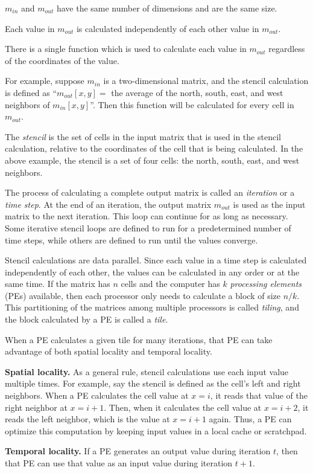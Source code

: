 \documentclass[preprint,nocopyrightspace]{styles/sigplanconf}
\begin{document}
\begin{enumerate*}
\item $m_{in}$ and $m_{out}$ have the same number of dimensions and
  are the same size.
\item Each value in $m_{out}$ is calculated independently of each
  other value in $m_{out}$.
\item There is a single function which is used to calculate each value
  in $m_{out}$ regardless of the coordinates of the value.
\end{enumerate*}

For example, suppose $m_{in}$ is a two-dimensional matrix, and the stencil calculation 
is defined as ``$m_{out}[x, y] =$ the average
of the north, south, east, and west neighbors of $m_{in}[x, y]$''.
Then this function will be calculated for every cell in $m_{out}$.

The {\em stencil} is the set of cells in the input matrix that is used in the stencil calculation, relative to
the coordinates of the cell that is being calculated. 
In the above example, the stencil is a set
of four cells: the north, south, east, and west neighbors.

The process of calculating a complete output matrix is called an {\em
  iteration} or a {\em time step}.  At the end of an iteration, 
the output matrix $m_{out}$ is used as the input matrix to the
next iteration.  This loop can continue for as long as necessary.
Some iterative stencil loops are defined to run for a predetermined
number of time steps, while others are defined to run until
the values converge.

Stencil calculations are data parallel.  Since each value in
a time step is calculated independently of each other, the values can be
calculated in any order or at the same time.  If the matrix has $n$
cells and the computer has $k$ {\em processing elements} (PEs) available,
then each processor only needs to calculate a block of size $n/k$.  This
partitioning of the matrices among multiple processors is called
{\em tiling}, and the block calculated by a PE is called a
{\em tile}.

When a PE calculates a given tile for many iterations, that PE can
take advantage of both spatial locality and temporal locality.
\begin{itemize*}
\item {\bf Spatial locality.} As a general rule, stencil calculations
  use each input value multiple times.  For example, say the
  stencil is defined as the cell's left and right neighbors.  When a
  PE calculates the cell value at $x=i$, it reads that value of
  the right neighbor at $x=i+1$.  Then, when it calculates the
  cell value at $x=i+2$, it reads the left neighbor, which
  is the value at $x=i+1$ again.  Thus, a PE can optimize this
  computation by keeping input values in a local cache or scratchpad.
\item {\bf Temporal locality.} If a PE generates an output value
  during iteration $t$, then that PE can use that value as an input
  value during iteration $t+1$.
\end{itemize*}
\end{document}
